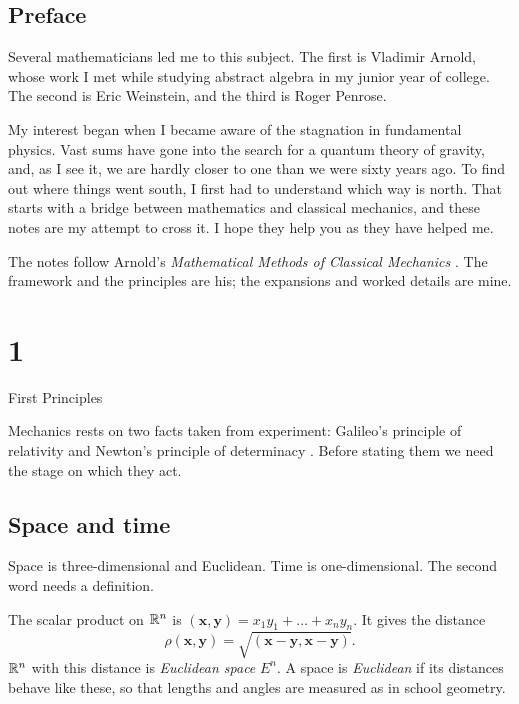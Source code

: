 \section*{Preface}

Several mathematicians led me to this subject. The first is Vladimir Arnold,
whose work I met while studying abstract algebra in my junior year of
college. The second is Eric Weinstein, and the third is Roger Penrose.

My interest began when I became aware of the stagnation in fundamental
physics. Vast sums have gone into the search for a quantum theory of
gravity, and, as I see it, we are hardly closer to one than we were sixty
years ago. To find out where things went south, I first had to understand
which way is north. That starts with a bridge between mathematics and
classical mechanics, and these notes are my attempt to cross it. I hope they
help you as they have helped me.

The notes follow Arnold's \emph{Mathematical Methods of Classical
Mechanics} \cite{arnold}. The framework and the principles are his; the
expansions and worked details are mine.

\chapter{1}{First Principles}

Mechanics rests on two facts taken from experiment: Galileo's principle of
relativity and Newton's principle of determinacy \cite[ch.~1]{arnold}.
Before stating them we need the stage on which they act.

\section{Space and time}\label{sec:space-time}

Space is three-dimensional and Euclidean. Time is one-dimensional. The
second word needs a definition.

\begin{definition}\label{def:euclidean}
  The scalar product on $\mathbb{R}^n$ is
  $(\mathbf x, \mathbf y) = x_1 y_1 + \dots + x_n y_n$. It gives the distance
  \[
    \rho(\mathbf x, \mathbf y) = \sqrt{(\mathbf x - \mathbf y, \mathbf x - \mathbf y)}.
  \]
  $\mathbb{R}^n$ with this distance is \emph{Euclidean space} $E^n$. A space is
  \emph{Euclidean} if its distances behave like these, so that lengths and
  angles are measured as in school geometry.
\end{definition}

